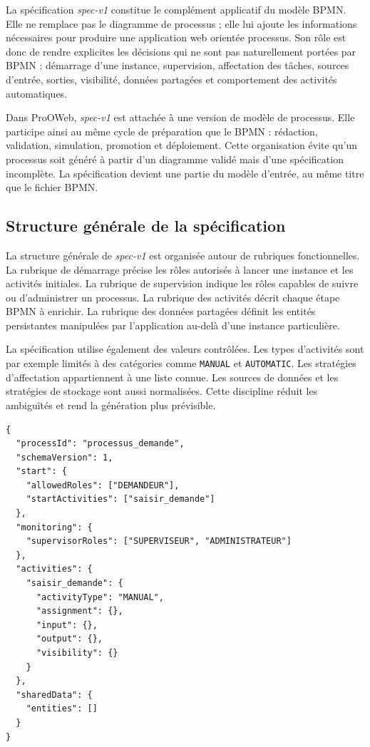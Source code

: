 
La spécification \textit{spec-v1} constitue le complément applicatif du modèle BPMN. Elle ne remplace pas le diagramme de processus ; elle lui ajoute les informations nécessaires pour produire une application web orientée processus. Son rôle est donc de rendre explicites les décisions qui ne sont pas naturellement portées par BPMN : démarrage d'une instance, supervision, affectation des tâches, sources d'entrée, sorties, visibilité, données partagées et comportement des activités automatiques.

Dans ProOWeb, \textit{spec-v1} est attachée à une version de modèle de processus. Elle participe ainsi au même cycle de préparation que le BPMN : rédaction, validation, simulation, promotion et déploiement. Cette organisation évite qu'un processus soit généré à partir d'un diagramme validé mais d'une spécification incomplète. La spécification devient une partie du modèle d'entrée, au même titre que le fichier BPMN.

\subsection{Structure générale de la spécification}

La structure générale de \textit{spec-v1} est organisée autour de rubriques fonctionnelles. La rubrique de démarrage précise les rôles autorisés à lancer une instance et les activités initiales. La rubrique de supervision indique les rôles capables de suivre ou d'administrer un processus. La rubrique des activités décrit chaque étape BPMN à enrichir. La rubrique des données partagées définit les entités persistantes manipulées par l'application au-delà d'une instance particulière.

La spécification utilise également des valeurs contrôlées. Les types d'activités sont par exemple limités à des catégories comme \texttt{MANUAL} et \texttt{AUTOMATIC}. Les stratégies d'affectation appartiennent à une liste connue. Les sources de données et les stratégies de stockage sont aussi normalisées. Cette discipline réduit les ambiguïtés et rend la génération plus prévisible.

\begin{lstlisting}[caption={Structure simplifiée de la spécification spec-v1},label={lst:chap3-structure-specv1}]
{
  "processId": "processus_demande",
  "schemaVersion": 1,
  "start": {
    "allowedRoles": ["DEMANDEUR"],
    "startActivities": ["saisir_demande"]
  },
  "monitoring": {
    "supervisorRoles": ["SUPERVISEUR", "ADMINISTRATEUR"]
  },
  "activities": {
    "saisir_demande": {
      "activityType": "MANUAL",
      "assignment": {},
      "input": {},
      "output": {},
      "visibility": {}
    }
  },
  "sharedData": {
    "entities": []
  }
}
\end{lstlisting}

